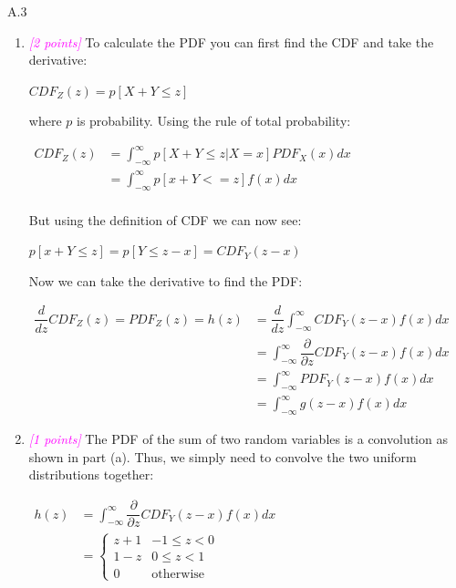 \documentclass{article}
\newcommand{\1}{\mathbf{1}}
\newcommand{\points}[1]{\small\textcolor{magenta}{\emph{[#1 points]}} \normalsize}
\begin{document}
A.3 
\begin{enumerate}
	\item \points{2} To calculate the PDF you can first find the CDF and take the derivative:
	\begin{center}
		$CDF_Z(z)=p[X+Y\leq z]$
	\end{center}
	where $p$ is probability. Using the rule of total probability:
	\begin{center}
		$\begin{aligned}
		CDF_Z(z)&=\int_{-\infty}^{\infty}p[X+Y\leq z|X=x]PDF_X(x)dx\\
		&=\int_{-\infty}^{\infty}p[x+Y<=z]f(x)dx\\
		\end{aligned}$
	\end{center}
	But using the definition of CDF we can now see:
	\begin{center}
		$p[x+Y\leq z]=p[Y\leq z-x]=CDF_Y(z-x)$
	\end{center}
	Now we can take the derivative to find the PDF:
	\begin{center}
		$\begin{aligned}
		\dfrac{d}{dz}CDF_Z(z)=PDF_Z(z)=h(z)&=\dfrac{d}{dz}\int_{-\infty}^{\infty}CDF_Y(z-x)f(x)dx\\
		&=\int_{-\infty}^{\infty}\dfrac{\partial}{\partial z}CDF_Y(z-x)f(x)dx\\
		&=\int_{-\infty}^{\infty}PDF_Y(z-x)f(x)dx\\
		&=\int_{-\infty}^{\infty}g(z-x)f(x)dx
		\end{aligned}$
	\end{center}
	
	\item \points{1} The PDF of the sum of two random variables is a convolution as shown in part (a). Thus, we simply need to convolve the two uniform distributions together:
	\begin{center}
		$\begin{aligned}
		h(z)&=\int_{-\infty}^{\infty}\dfrac{\partial}{\partial z}CDF_Y(z-x)f(x)dx\\
		&=\begin{cases}
		z+1 & -1\leq z<0\\
		1-z & 0\leq z<1\\
		0 & \text{otherwise}
		\end{cases}\\
		\end{aligned}$
	\end{center}
\end{enumerate}
\end{document}
